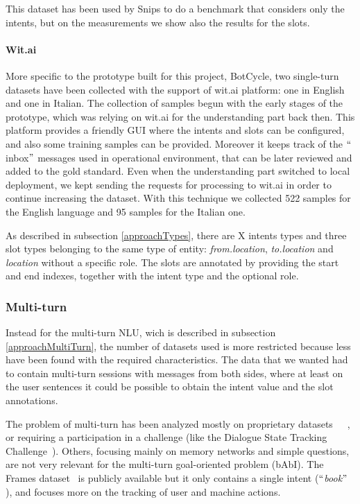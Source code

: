This dataset has been used by Snips to do a benchmark that considers only the intents, but on the measurements we show also the results for the slots.

\paragraph{Wit.ai}
More specific to the prototype built for this project, BotCycle, two single-turn datasets have been collected with the support of wit.ai platform: one in English and one in Italian. The collection of samples begun with the early stages of the prototype, which was relying on wit.ai for the understanding part back then. This platform provides a friendly GUI where the intents and slots can be configured, and also some training samples can be provided. Moreover it keeps track of the $``$inbox$"$  messages used in operational environment, that can be later reviewed and added to the gold standard. Even when the understanding part switched to local deployment, we kept sending the requests for processing to wit.ai in order to continue increasing the dataset. With this technique we collected 522 samples for the English language and 95 samples for the Italian one.

As described in subsection \ref{approachTypes}, there are X intents types and three slot types belonging to the same type of entity: \textit{from.location}, \textit{to.location} and \textit{location} without a specific role. The slots are annotated by providing the start and end indexes, together with the intent type and the optional role.

\subsubsection{Multi-turn}
Instead for the multi-turn NLU, wich is described in subsection \ref{approachMultiTurn}, the number of datasets used is more restricted because less have been found with the required characteristics. The data that we wanted had to contain multi-turn sessions with messages from both sides, where at least on the user sentences it could be possible to obtain the intent value and the slot annotations.

The problem of multi-turn has been analyzed mostly on proprietary datasets~\cite{shi2015contextual}~\cite{xu2014contextual}~\cite{bhargava2013easy}, or requiring a participation in a challenge (like the Dialogue State Tracking Challenge~\cite{williams2013dialog}). Others, focusing mainly on memory networks and simple questions, are not very relevant for the multi-turn goal-oriented problem (bAbI). The Frames dataset~\cite{asri2017frames} is publicly available but it only contains a single intent ($``$\textit{book}$"$ ), and focuses more on the tracking of user and machine actions.

